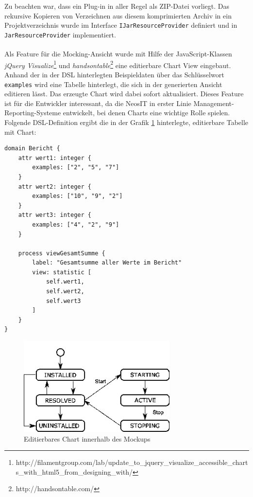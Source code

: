 \documentclass[a4paper,12pt]{scrreprt}
\begin{document}
Zu beachten war, dass ein Plug-in in aller Regel als ZIP-Datei vorliegt. Das rekursive Kopieren von Verzeichnen aus diesem komprimierten Archiv in ein Projektverzeichnis wurde im Interface \verb+IJarResourceProvider+ definiert und in \verb+JarResourceProvider+ implementiert.
\\
\\
Als Feature für die Mocking-Ansicht wurde mit Hilfe der JavaScript-Klassen  \emph{jQuery Visualize}\footnote{http://filamentgroup.com/lab/update\_to\_jquery\_visualize\_accessible\_charts\_with\_html5\_from\_designing\_with/} und \emph{handsontable}\footnote{http://handsontable.com/} eine editierbare Chart View eingebaut.
Anhand der in der DSL hinterlegten Beispieldaten über das Schlüsselwort \verb+examples+ wird eine Tabelle hinterlegt, die sich in der generierten Ansicht editieren lässt. Das erzeugte Chart wird dabei sofort aktualisiert. Dieses Feature ist für die Entwickler interessant, da die NeosIT in erster Linie Management-Reporting-Systeme entwickelt, bei denen Charts eine wichtige Rolle spielen.
Folgende DSL-Definition ergibt die in der Grafik \ref{fig:editable-chart-table.png} hinterlegte, editierbare Tabelle mit Chart:
\begin{verbatim}
domain Bericht {
    attr wert1: integer {
        examples: ["2", "5", "7"]
    }
    attr wert2: integer {
        examples: ["10", "9", "2"]
    }
    attr wert3: integer {
        examples: ["4", "2", "9"]
    }
    
    process viewGesamtSumme {
        label: "Gesamtsumme aller Werte im Bericht"
        view: statistic [
            self.wert1,
            self.wert2,
            self.wert3
        ]
    }
}
\end{verbatim}
\begin{figure}[h]
	\centering
		\includegraphics[width=300px]{img/editable-chart-table.png}
		\caption{Editierbares Chart innerhalb des Mockups}
		\label{fig:editable-chart-table.png}
\end{figure}
\end{document}
